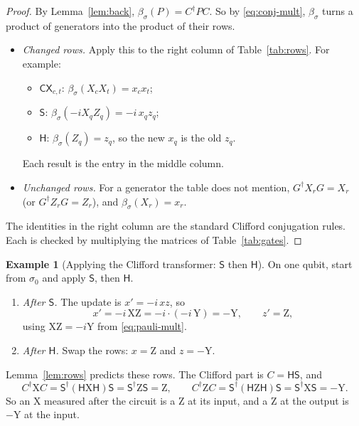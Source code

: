 \documentclass[11pt]{article}
\theoremstyle{definition}
\newtheorem{example}[theorem]{Example}
\theoremstyle{remark}
\newcommand{\adj}{^{\dagger}}
\newcommand{\back}{\beta}
\newcommand{\tX}{\mathrm{X}}
\newcommand{\tY}{\mathrm{Y}}
\newcommand{\tZ}{\mathrm{Z}}
\newcommand{\gate}[1]{\mathsf{#1}}
\begin{document}
\begin{proof}
By Lemma~\ref{lem:back}, $\back_\sigma(P) = C\adj P C$. So by \eqref{eq:conj-mult},
$\back_\sigma$ turns a product of generators into the product of their rows.
\begin{itemize}[nosep]
  \item \emph{Changed rows.} Apply this to the right column of Table~\ref{tab:rows}. For
  example:
  \begin{itemize}[nosep]
    \item $\gate{CX}_{c,t}$: $\back_\sigma(X_c X_t) = x_c x_t$;
    \item $\gate{S}$: $\back_\sigma(-i X_q Z_q) = -i\,x_q z_q$;
    \item $\gate{H}$: $\back_\sigma(Z_q) = z_q$, so the new $x_q$ is the old $z_q$.
  \end{itemize}
  Each result is the entry in the middle column.
  \item \emph{Unchanged rows.} For a generator the table does not mention,
  $G\adj X_r G = X_r$ (or $G\adj Z_r G = Z_r$), and $\back_\sigma(X_r) = x_r$.
\end{itemize}
The identities in the right column are the standard Clifford conjugation rules. Each is
checked by multiplying the matrices of Table~\ref{tab:gates}.
\end{proof}

\begin{example}[Applying the Clifford transformer: $\gate S$ then $\gate H$]\label{ex:sh}
On one qubit, start from $\sigma_0$ and apply $\gate S$, then $\gate H$.
\begin{enumerate}[nosep]
  \item \emph{After $\gate S$.} The update is $x' = -i\,xz$, so
  \[
    x' = -i\,\tX\tZ = -i \cdot (-i\,\tY) = -\tY, \qquad z' = \tZ ,
  \]
  using $\tX\tZ = -i\tY$ from \eqref{eq:pauli-mult}.
  \item \emph{After $\gate H$.} Swap the rows: $x = \tZ$ and $z = -\tY$.
\end{enumerate}
Lemma~\ref{lem:rows} predicts these rows. The Clifford part is $C = \gate H\gate S$, and
\[
  C\adj \tX C = \gate S\adj (\gate H \tX \gate H) \gate S = \gate S\adj \tZ \gate S = \tZ,
  \qquad
  C\adj \tZ C = \gate S\adj (\gate H \tZ \gate H) \gate S = \gate S\adj \tX \gate S = -\tY .
\]
So an $\tX$ measured after the circuit is a $\tZ$ at its input, and a $\tZ$ at the output
is $-\tY$ at the input.
\end{example}
\end{document}
